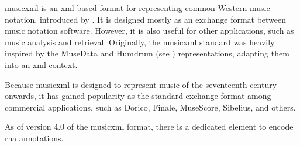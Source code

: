 


\gls{musicxml} is an \gls{xml}-based format for representing
common Western music notation, introduced by
\textcite{good2001musicxml}. It is designed mostly as an
exchange format between music notation software. However, it
is also useful for other applications, such as music
analysis and retrieval. Originally, the \gls{musicxml}
standard was heavily inspired by the MuseData and Humdrum
(see ) representations,
adapting them into an \gls{xml} context.



Because \gls{musicxml} is designed to represent music of the
seventeenth century onwards, it has gained popularity as the
standard exchange format among commercial applications, such
as Dorico,
Finale,
MuseScore,
Sibelius, and
others.



As of version 4.0 of the \gls{musicxml} format, there is a
dedicated 
element
to encode \gls{rna} annotations.
